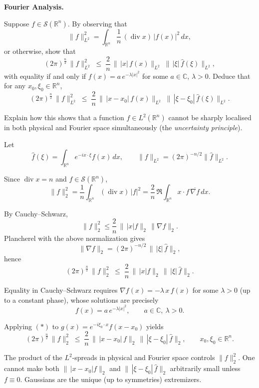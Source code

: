\begin{problem}[CP-II-0336]
\label{prob:cp-ii-0336}
\textbf{Fourier Analysis.}

\hspace*{1.5em}Suppose $f\in \mathcal S(\mathbb R^n)$. By observing that
\[
\|f\|_{L^2}^2
=\int_{\mathbb R^n}\frac{1}{n}\,(\operatorname{div}x)\,|f(x)|^2\,dx,
\]
or otherwise, show that
\[
(2\pi)^{\frac n2}\,\|f\|_{L^2}^2
\;\le\; \frac{2}{n}\,\big\|\,|x|\,f(x)\big\|_{L^2}\;\big\|\,|\xi|\,\widehat f(\xi)\big\|_{L^2},
\]
with equality if and only if $f(x)=a\,e^{-\lambda|x|^2}$ for some $a\in\mathbb C$, $\lambda>0$.
Deduce that for any $x_0,\xi_0\in\mathbb R^n$,
\[
(2\pi)^{\frac n2}\,\|f\|_{L^2}^2
\;\le\; \frac{2}{n}\,\big\|\,|x-x_0|\,f(x)\big\|_{L^2}\;\big\|\,|\xi-\xi_0|\,\widehat f(\xi)\big\|_{L^2}.
\]

\medskip

\noindent Explain how this shows that a function $f\in L^2(\mathbb R^n)$ cannot be sharply localised in both physical and Fourier space simultaneously (the \emph{uncertainty principle}).

Let
\[
\widehat f(\xi)=\int_{\mathbb R^n} e^{-i x\cdot \xi} f(x)\,dx,
\qquad \|f\|_{L^2}=(2\pi)^{-n/2}\|\widehat f\|_{L^2}.
\]

\smallskip

Since $\operatorname{div}x=n$ and $f\in\mathcal S(\mathbb R^n)$,
\[
\|f\|_2^2
=\frac1n\int_{\mathbb R^n}(\operatorname{div}x)\,|f|^2
=\frac2n\,\Re\int_{\mathbb R^n} x\cdot f\,\overline{\nabla f}\,dx.
\]

\smallskip

By Cauchy--Schwarz,
\[
\|f\|_2^2 \le \frac2n\,\|\,|x|f\|_2\,\|\nabla f\|_2.
\]
Plancherel with the above normalization gives
\[
\|\nabla f\|_2=(2\pi)^{-n/2}\,\|\,|\xi|\,\widehat f\|_2,
\]
hence
\[
(2\pi)^{\frac n2}\,\|f\|_2^2
\;\le\; \frac2n\,\|\,|x|f\|_2\,\|\,|\xi|\,\widehat f\|_2.
\tag{$\ast$}
\]

\smallskip

Equality in Cauchy--Schwarz requires $\nabla f(x)=-\lambda\,x\,f(x)$ for some $\lambda>0$
(up to a constant phase), whose solutions are precisely
\[
f(x)=a\,e^{-\lambda|x|^2},\qquad a\in\mathbb C,\ \lambda>0.
\]

\smallskip

Applying $(\ast)$ to $g(x)=e^{-i\xi_0\cdot x}f(x-x_0)$ yields
\[
(2\pi)^{\frac n2}\,\|f\|_2^2
\;\le\; \frac2n\,\|\,|x-x_0|\,f\|_2\,\|\,|\xi-\xi_0|\,\widehat f\|_2,
\qquad x_0,\xi_0\in\mathbb R^n.
\]

\smallskip

The product of the $L^2$-spreads in physical and Fourier space controls $\|f\|_2^2$.
One cannot make both $\|\,|x-x_0|f\|_2$ and $\|\,|\xi-\xi_0|\,\widehat f\|_2$ arbitrarily small unless $f\equiv0$.
Gaussians are the unique (up to symmetries) extremizers.
\end{problem}

